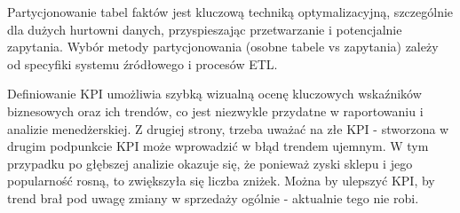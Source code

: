 \documentclass[a4paper,12pt]{article}
\begin{document}
Partycjonowanie tabel faktów jest kluczową techniką optymalizacyjną, szczególnie dla dużych hurtowni danych, przyspieszając przetwarzanie i potencjalnie zapytania. Wybór metody partycjonowania (osobne tabele vs zapytania) zależy od specyfiki systemu źródłowego i procesów ETL.

Definiowanie KPI umożliwia szybką wizualną ocenę kluczowych wskaźników biznesowych oraz ich trendów, co jest niezwykle przydatne w raportowaniu i analizie menedżerskiej.
Z drugiej strony, trzeba uważać na złe KPI - stworzona w drugim podpunkcie KPI może wprowadzić w błąd trendem ujemnym. W tym przypadku po głębszej analizie okazuje się, że ponieważ zyski sklepu i jego popularność rosną, to zwiększyła się liczba zniżek. Można by ulepszyć KPI, by trend brał pod uwagę zmiany w sprzedaży ogólnie - aktualnie tego nie robi.

\printbibliography
\end{document}
